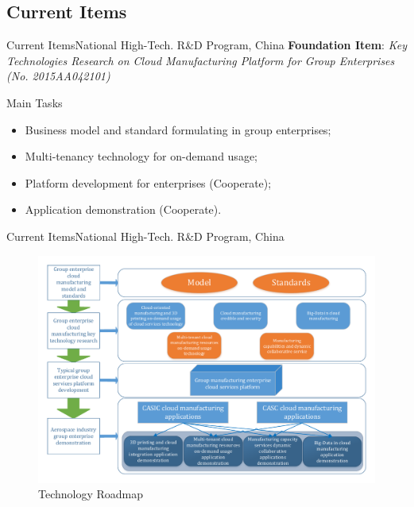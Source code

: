 \subsection{Current Items}

\begin{frame}{Current Items}{National High-Tech. R\&D Program, China}
\textbf{Foundation Item}: \textit{Key Technologies Research on Cloud Manufacturing Platform for Group Enterprises (No. 2015AA042101)}
\begin{block}{Main Tasks}
  \begin{itemize}
  \item Business model and standard formulating in group enterprises;
  \item Multi-tenancy technology for on-demand usage;
  \item Platform development for enterprises (Cooperate);
  \item Application demonstration (Cooperate).
  \end{itemize}
\end{block}
\end{frame}
\begin{frame}{Current Items}{National High-Tech. R\&D Program, China}
	\begin{figure}
		\centering
		\includegraphics[height=0.85\textheight]{figures/techrouteorange.pdf}
		\caption{Technology Roadmap}
	\end{figure}
\end{frame}


